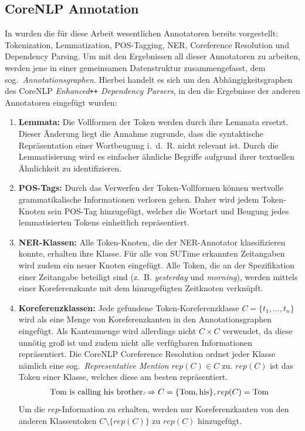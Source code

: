 \subsection{CoreNLP Annotation}%
\label{sec:text2kg:nlp:corenlp}

In  wurden die für diese Arbeit wesentlichen Annotatoren bereits vorgestellt: Tokenization, Lemmatization, POS-Tagging, NER, Coreference Resolution und Dependency Parsing.
Um mit den Ergebnissen all dieser Annotatoren zu arbeiten, werden jene in einer gemeinsamen Datenstruktur zusammengefasst, dem sog.\ \textit{Annotations\-graphen}.
Hierbei handelt es sich um den Abhängigkeitsgraphen des CoreNLP \textit{Enhanced\texttt{++} Dependency Parsers}, in den die Ergebnisse der anderen Annotatoren eingefügt wurden:
\begin{enumerate}
	\item \textbf{Lemmata:}
		Die Vollformen der Token werden durch ihre Lemmata ersetzt.
		Dieser Änderung liegt die Annahme zugrunde, dass die syntaktische Repräsentation einer Wortbeugung i.~d.~R. nicht relevant ist.
		Durch die Lemmatisierung wird es einfacher ähnliche Begriffe aufgrund ihrer textuellen Ähnlichkeit zu identifizieren.
	\item \textbf{POS-Tags:}
		Durch das Verwerfen der Token-Vollformen können wertvolle grammatikalische Informationen verloren gehen.
		Daher wird jedem Token-Knoten sein POS-Tag hinzugefügt, welcher die Wortart und Beugung jedes lemmatisierten Tokens einheitlich repräsentiert.
	\item \textbf{NER-Klassen:}
		Alle Token-Knoten, die der NER-Annotator klassifizieren konnte, erhalten ihre Klasse.
		Für alle von SUTime erkannten Zeitangaben wird zudem ein neuer Knoten eingefügt.
		Alle Token, die an der Spezifikation einer Zeitangabe beteiligt sind (z.~B. \textit{yesterday} und \textit{morning}), werden mittels einer Koreferenzkante mit dem hinzugefügten Zeitknoten verknüpft.
	\item \textbf{Koreferenzklassen:}
		Jede gefundene Token-Koreferenzklasse $C = \{t_1, \dots, t_n\}$ wird als eine Menge von Koreferenzkanten in den Annotationsgraphen eingefügt.
		Als Kantenmenge wird allerdings nicht $C \times C$ verwendet, da diese unnötig groß ist und zudem nicht alle verfügbaren Informationen repräsentiert.
		Die CoreNLP Coreference Resolution ordnet jeder Klasse nämlich eine sog.\ \textit{Representative Mention} $rep(C) \in C$ zu.
		$rep(C)$ ist das Token einer Klasse, welches diese am besten repräsentiert.
		\begin{align*}
			\text{T}\tikzmark{toma}\text{om is calling hi}\tikzmark{tomb}\text{s brother.}
			\begin{tikzpicture}[overlay,remember picture]
				\draw[-,shorten >=3pt,shorten <=3pt] (toma.center) to[bend right] (tomb.center);
			\end{tikzpicture}
			\Rightarrow
			C = \{\text{Tom}, \text{his}\}, rep(C) = \text{Tom}
		\end{align*}
		Um die $rep$-Information zu erhalten, werden nur Koreferenzkanten von den anderen Klassentoken $C \setminus \{rep(C)\}$ zu $rep(C)$ hinzugefügt.
\end{enumerate}


